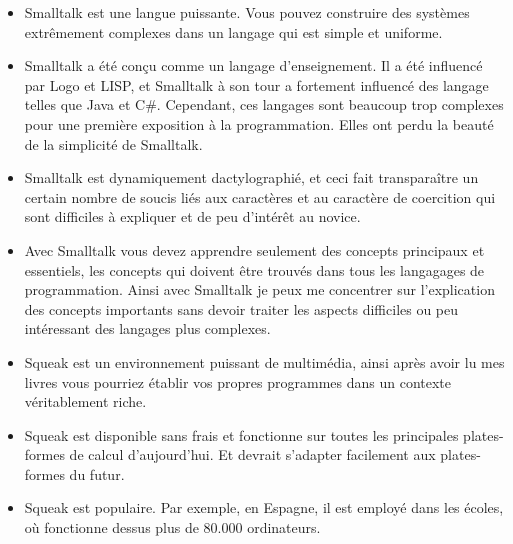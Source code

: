 \documentclass[a4paper,10pt,twoside]{book}
\begin{document}
\begin{itemize}
\item  Smalltalk est une langue puissante. Vous pouvez construire des syst\`emes extr\^emement complexes dans un langage qui est simple et uniforme.
\item  Smalltalk a \'et\'e con\c cu comme un langage d'enseignement. Il a \'et\'e influenc\'e par Logo et LISP, et Smalltalk  \`a son tour a fortement influenc\'e des langage telles que Java et C\#. Cependant, ces langages sont beaucoup trop complexes pour une premi\`ere exposition \`a la programmation. Elles ont perdu la beaut\'e de la simplicit\'e de Smalltalk.
\item  Smalltalk est dynamiquement dactylographi\'e, et ceci fait transpara\^itre un certain nombre de soucis li\'es aux caract\`eres et au caract\`ere de coercition qui sont difficiles \`a expliquer et de peu d'int\'er\^et au novice.
\item  Avec Smalltalk vous devez apprendre seulement des concepts principaux et essentiels, les concepts qui doivent \^etre trouv\'es dans tous les langagages de programmation. Ainsi avec Smalltalk je peux me concentrer sur l'explication des concepts importants sans devoir traiter les aspects difficiles ou peu int\'eressant des langages plus complexes.
\item  Squeak est un environnement puissant de multim\'edia, ainsi apr\`es avoir lu mes livres vous pourriez \'etablir vos propres programmes dans un contexte v\'eritablement riche.
\item  Squeak est disponible sans frais et fonctionne sur toutes les principales plates-formes de calcul d'aujourd'hui. Et devrait s'adapter facilement aux plates-formes du futur.
\item  Squeak est populaire. Par exemple, en Espagne, il est employ\'e dans les \'ecoles, o\`u fonctionne dessus plus de 80.000 ordinateurs.
\end{itemize}

\ifx\wholebook\relax\else
    
\end{document}
